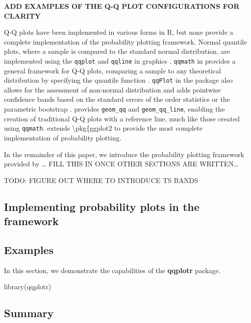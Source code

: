 \textbf{ADD EXAMPLES OF THE Q-Q PLOT CONFIGURATIONS FOR CLARITY}

Q-Q plots have been implemented in various forms in R, but none provide
a complete implementation of the probability plotting framework. Normal
quantile plots, where a sample is compared to the standard normal
distribution, are implemented using the \texttt{qqplot} and
\texttt{qqline} in  graphics \citep{R}. \texttt{qqmath} in
 provides a general framework for Q-Q plots, comparing a
sample to any theoretical distribution by specifying the quantile
function \citep{lattice}. \texttt{qqPlot} in the  package also
allows for the assessment of non-normal distribution and adds pointwise
confidence bands based on the standard errors of the order statistics or
the parametric bootstrap \citep{car}.  provides
\texttt{geom\_qq} and \texttt{geom\_qq\_line}, enabling the creation of
traditional Q-Q plots with a reference line, much like those created
using \texttt{qqmath}.  extends
\textbackslash{}pkg\{ggplot2 to provide the most complete implementation
of probability plotting.

In the remainder of this paper, we introduce the probability plotting
framework provided by \ldots{} FILL THIS IN ONCE OTHER
SECTIONS ARE WRITTEN\ldots{}

TODO: FIGURE OUT WHERE TO INTRODUCE TS BANDS \citep{Aldor-Noiman2013-xw}

\subsection{\texorpdfstring{Implementing probability plots in the
framework}{Implementing probability plots in the  framework}}\label{implementing-probability-plots-in-the-framework}

\subsection{Examples}\label{examples}

In this section, we demonstrate the capabilities of the \textbf{qqplotr}
package.

\begin{Schunk}
\begin{Sinput}
library(qqplotr)
\end{Sinput}
\end{Schunk}

\subsection{Summary}\label{summary}

